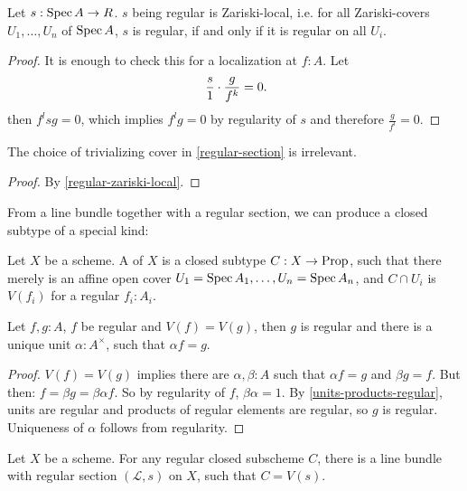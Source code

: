 \begin{lemma}%
  \label{regular-zariski-local}
  Let $s:\operatorname{Spec} A\to R$.
  $s$ being regular is Zariski-local, i.e.
  for all Zariski-covers $U_1,\dots,U_n$ of $\operatorname{Spec} A$,
  $s$ is regular, if and only if it is regular on all $U_i$.
\end{lemma}

\begin{proof}
  It is enough to check this for a localization at $f:A$.
  Let
  \[ \frac{s}{1}\cdot\frac{g}{f^k}=0\rlap{.} \]
  then $f^lsg=0$, which implies $f^lg=0$ by regularity of $s$ and therefore $\frac{g}{f^l}=0$.
\end{proof}

\begin{proposition}%
  The choice of trivializing cover in \cref{regular-section}
  is irrelevant.
\end{proposition}

\begin{proof}
  By \cref{regular-zariski-local}.
\end{proof}

From a line bundle together with a regular section,
we can produce a closed subtype of a special kind:

\begin{definition}%
  Let $X$ be a scheme.
  A  of $X$ is a closed subtype
  $C:X\to \mathrm{Prop}$, such that there merely is an affine open cover $U_1=\operatorname{Spec} A_1,\dots,U_n=\operatorname{Spec} A_n$,
  and $C\cap U_i$ is $V(f_i)$ for a regular $f_i:A_i$.
\end{definition}

\begin{lemma}%
  Let $f,g:A$, $f$ be regular and $V(f)=V(g)$,
  then $g$ is regular and there is a unique unit $\alpha:A^\times$, such that $\alpha f=g$.
\end{lemma}

\begin{proof}
  $V(f)=V(g)$ implies there are $\alpha,\beta:A$ such that
  $\alpha f = g$ and $\beta g = f$.
  But then: $f=\beta g=\beta\alpha f$.
  So by regularity of $f$, $\beta\alpha=1$.
  By \cref{units-products-regular}, units are regular and products of regular elements are regular,
  so $g$ is regular.
  Uniqueness of $\alpha$ follows from regularity.
\end{proof}

\begin{theorem}%
  Let $X$ be a scheme.
  For any regular closed subscheme $C$,
  there is a line bundle with regular section $(\mathcal L,s)$ on $X$,
  such that $C=V(s)$.
\end{theorem}

